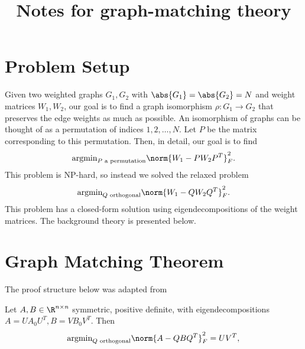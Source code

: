 \documentclass[12pt]{article}
\title{Notes for graph-matching theory}
\begin{document}
\maketitle

\section{Problem Setup}

Given two weighted graphs $G_1,G_2$ with $\abs{G_1} = \abs{G_2} = N$ and weight
matrices $W_1,W_2$, our goal is to find a graph isomorphism $\rho: G_1\to G_2$
that preserves the edge weights as much as possible. An isomorphism of graphs
can be thought of as a permutation of indices $1,2,\ldots,N$. Let $P$ be the matrix corresponding to this permutation. Then, in detail, our goal is to find
\begin{align}
  \text{argmin}_{P \text{ a permutation}}\norm{W_1 - PW_2P^T}_F^2.
\end{align}
This problem is NP-hard, so instead we solved the relaxed problem
\begin{align}
  \text{argmin}_{Q \text{ orthogonal}}\norm{W_1 - QW_2Q^T}_F^2.
\end{align}
This problem has a closed-form solution using eigendecompositions of the weight matrices. The background theory is presented below.

\section{Graph Matching Theorem}
The proof structure below was adapted from \cite{Umeyama1988,Hoffman1953}
\begin{theorem}
  Let $A,B \in \R^{n\times n}$ symmetric, positive definite, with eigendecompositions $A = UA_0U^T, B = VB_0V^T$. Then
  \begin{align}
    \text{argmin}_{Q\text{ orthogonal}}\norm{A - QBQ^T}_F^2 = UV^T,
  \end{align}
\end{theorem}
\end{document}
